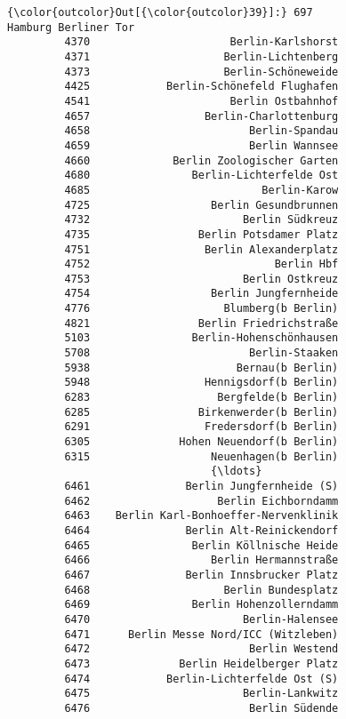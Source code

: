 \documentclass[11pt]{article}
\begin{document}
\begin{Verbatim}[commandchars=\\\{\}]
{\color{outcolor}Out[{\color{outcolor}39}]:} 697                    Hamburg Berliner Tor
         4370                      Berlin-Karlshorst
         4371                     Berlin-Lichtenberg
         4373                     Berlin-Schöneweide
         4425            Berlin-Schönefeld Flughafen
         4541                      Berlin Ostbahnhof
         4657                  Berlin-Charlottenburg
         4658                         Berlin-Spandau
         4659                         Berlin Wannsee
         4660             Berlin Zoologischer Garten
         4680                Berlin-Lichterfelde Ost
         4685                           Berlin-Karow
         4725                   Berlin Gesundbrunnen
         4732                        Berlin Südkreuz
         4735                 Berlin Potsdamer Platz
         4751                  Berlin Alexanderplatz
         4752                             Berlin Hbf
         4753                        Berlin Ostkreuz
         4754                   Berlin Jungfernheide
         4776                     Blumberg(b Berlin)
         4821                 Berlin Friedrichstraße
         5103                Berlin-Hohenschönhausen
         5708                         Berlin-Staaken
         5938                       Bernau(b Berlin)
         5948                  Hennigsdorf(b Berlin)
         6283                    Bergfelde(b Berlin)
         6285                 Birkenwerder(b Berlin)
         6291                  Fredersdorf(b Berlin)
         6305              Hohen Neuendorf(b Berlin)
         6315                   Neuenhagen(b Berlin)
                                {\ldots}                 
         6461               Berlin Jungfernheide (S)
         6462                    Berlin Eichborndamm
         6463    Berlin Karl-Bonhoeffer-Nervenklinik
         6464               Berlin Alt-Reinickendorf
         6465                Berlin Köllnische Heide
         6466                   Berlin Hermannstraße
         6467               Berlin Innsbrucker Platz
         6468                     Berlin Bundesplatz
         6469                Berlin Hohenzollerndamm
         6470                        Berlin-Halensee
         6471      Berlin Messe Nord/ICC (Witzleben)
         6472                         Berlin Westend
         6473              Berlin Heidelberger Platz
         6474            Berlin-Lichterfelde Ost (S)
         6475                        Berlin-Lankwitz
         6476                         Berlin Südende

\end{Verbatim}
\end{document}
